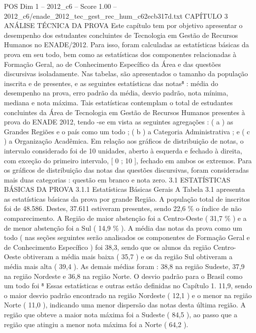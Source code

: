 \begin{textsample}{POS Dim 1 – 2012\_c6 – Score 1.00 – 2012\_c6/enade\_2012\_tec\_gest\_rec\_hum\_c62ecb317d.txt}  \label{ex:f1_pos_181}
CAPÍTULO 3 ANÁLISE TÉCNICA DA PROVA Este capítulo tem por objetivo apresentar o desempenho dos estudantes concluintes de Tecnologia em Gestão de Recursos Humanos no ENADE/2012.
Para isso, foram calculadas as estatísticas básicas da prova em seu todo, bem como as estatísticas dos componentes relacionadas à Formação Geral, ao de Conhecimento Específico da Área e das questões discursivas isoladamente.
Nas tabelas, são apresentados o tamanho da população inscrita e de presentes, e as seguintes estatísticas das notas⁸ : média do desempenho na prova, erro padrão da média, desvio padrão, nota mínima, mediana e nota máxima.
Tais estatísticas contemplam o total de estudantes concluintes da Área de Tecnologia em Gestão de Recursos Humanos presentes à prova do ENADE 2012, tendo -se em vista as seguintes agregações : ( a ) as Grandes Regiões e o país como um todo ; ( b ) a Categoria Administrativa ; e ( c ) a Organização Acadêmica.
Em relação aos gráficos de distribuição de notas, o intervalo considerado foi de 10 unidades, aberto à esquerda e fechado à direita, com exceção do primeiro intervalo, [ 0 ; 10 ], fechado em ambos os extremos.
Para os gráficos de distribuição das notas das questões discursivas, foram consideradas mais duas categorias : questão em branco e nota zero. 3.1 ESTATÍSTICAS BÁSICAS DA PROVA 3.1.1 Estatísticas Básicas Gerais A Tabela 3.1 apresenta as estatísticas básicas da prova por grande Região.
A população total de inscritos foi de 48.586.
Destes, 37.611 estiveram presentes, sendo 22,6 \% o índice de não comparecimento.
A Região de maior abstenção foi a Centro-Oeste ( 31,7 \% ) e a de menor abstenção foi a Sul ( 14,9 \% ).
A média das notas da prova como um todo ( nas seções seguintes serão analisados os componentes de Formação Geral e de Conhecimento Específico ) foi 38,3, sendo que os alunos da região Centro-Oeste obtiveram a média mais baixa ( 35,7 ) e os da região Sul obtiveram a média mais alta ( 39,4 ).
As demais médias foram : 38,8 na região Sudeste, 37,9 na região Nordeste e 36,8 na região Norte.
O desvio padrão para o Brasil como um todo foi ⁸ Essas estatísticas e outras estão definidas no Capítulo 1. 11,9, sendo o maior desvio padrão encontrado na região Nordeste ( 12,1 ) e o menor na região Norte ( 11,0 ), indicando uma menor dispersão das notas desta última região.
A região que obteve a maior nota máxima foi a Sudeste ( 84,5 ), ao passo que a região que atingiu a menor nota máxima foi a Norte ( 64,2 ).

\end{textsample}
